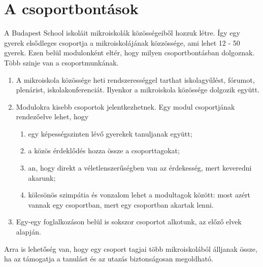 \section{A csoportbontások}
\label{sec:csoportbontasok}

A Budapest School iskoláit mikroiskolák közösségeiből hozzuk létre. Így
egy gyerek elsődleges csoportja a mikroiskolájának közzössége, ami lehet
12 - 50 gyerek. Ezen belül modulonként eltér, hogy milyen
csoportbontásban dolgoznak. Több szinje van a csoportmunkának.
\begin{enumerate}

      \item A mikroiskola közössége heti rendszerességgel tarthat
            iskolagyűlést,
            fórumot, plenárist, iskolakonferenciát. Ilyenkor a mikroiskola
            közössége
            dolgozik együtt.
      \item  Modulokra kisebb csoportok jelentkezhetnek. Egy modul
            csoportjának rendezőelve lehet, hogy
            \begin{enumerate}
                  \item egy képességszinten lévő gyerekek tanuljanak együtt;
                  \item a közös érdeklődés hozza össze a
                        csoporttagokat;
                  \item an, hogy direkt a véletlenszerűségben van az
                        érdekesség, mert keveredni akarunk;
                  \item kölcsönös szimpátia és vonzalom
                        lehet a modultagok között: most azért vannak egy
                        csoportban,
                        mert egy
                        csoportban akartak lenni.
            \end{enumerate}
      \item  Egy-egy foglalkozáson belül is sokszor
            csoportot alkotunk, az előző elvek alapján.

\end{enumerate}

Arra is lehetőség van, hogy egy csoport tagjai több mikroiskolából álljanak
össze, ha az támogatja a tanulást és az utazás biztonságosan megoldható.